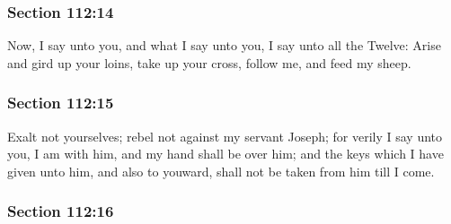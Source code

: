 
	\subsubsection{Section 112:14} %
		\label{DC112-14}

		Now, I say unto you, and what I say unto you, I say unto all the Twelve: Arise and gird up your loins, take up your cross, follow me, and feed my sheep.


	\subsubsection{Section 112:15} %
		\label{DC112-15}

		Exalt not yourselves; rebel not against my servant Joseph; for verily I say unto you, I am with him, and my hand shall be over him; and the keys which I have given unto him, and also to youward, shall not be taken from him till I come.


	\subsubsection{Section 112:16} %
		\label{DC112-16}

